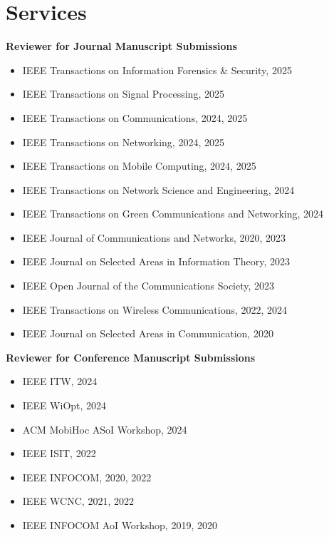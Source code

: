 \documentclass[letterpaper,11pt]{article}
\begin{document}
\section{Services}
{\bf Reviewer for Journal Manuscript Submissions}
\vspace{-5pt}
\begin{itemize}
 \setlength\itemsep{-5pt}
 \item IEEE Transactions on Information Forensics \& Security, 2025
 \item IEEE Transactions on Signal Processing, 2025
 \item IEEE Transactions on Communications, 2024, 2025
\item IEEE Transactions on Networking, 2024, 2025
\item IEEE Transactions on Mobile Computing, 2024, 2025
\item IEEE Transactions on Network Science and Engineering, 2024\\
\item IEEE Transactions on Green Communications and Networking, 2024 \\
   
\item IEEE Journal of Communications and Networks, 2020, 2023 \\
\item IEEE Journal on Selected Areas in Information Theory, 2023 \\
\item IEEE Open Journal of the Communications Society, 2023 \\
\item IEEE Transactions on Wireless Communications, 2022, 2024 \\
\item IEEE Journal on Selected Areas in Communication, 2020 

\end{itemize}
\vspace{-5pt}
{\bf Reviewer for Conference Manuscript Submissions}
\vspace{-5pt}
\begin{itemize}
 \setlength\itemsep{-5pt}
\item IEEE ITW, 2024
\item IEEE WiOpt, 2024
\item ACM MobiHoc ASoI Workshop, 2024
\item IEEE ISIT, 2022 
\item IEEE INFOCOM, 2020, 2022
\item IEEE WCNC, 2021, 2022
\item IEEE INFOCOM AoI Workshop, 2019, 2020
\end{itemize}
\end{document}
